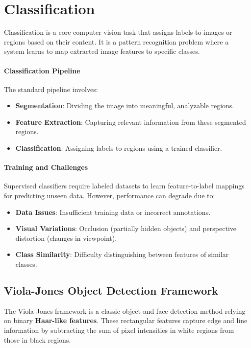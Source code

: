 \section{Classification}
Classification is a core computer vision task that assigns labels to images or regions based on their content. It is a pattern recognition problem where a system learns to map extracted image features to specific classes.

\paragraph{Classification Pipeline}
The standard pipeline involves:
\begin{itemize}
    \item \textbf{Segmentation}: Dividing the image into meaningful, analyzable regions.
    \item \textbf{Feature Extraction}: Capturing relevant information from these segmented regions.
    \item \textbf{Classification}: Assigning labels to regions using a trained classifier.
\end{itemize}

\paragraph{Training and Challenges}
Supervised classifiers require labeled datasets to learn feature-to-label mappings for predicting unseen data. However, performance can degrade due to:
\begin{itemize}
    \item \textbf{Data Issues}: Insufficient training data or incorrect annotations.
    \item \textbf{Visual Variations}: Occlusion (partially hidden objects) and perspective distortion (changes in viewpoint).
    \item \textbf{Class Similarity}: Difficulty distinguishing between features of similar classes.
\end{itemize}

\subsection{Viola-Jones Object Detection Framework}
The Viola-Jones framework is a classic object and face detection method relying on binary \textbf{Haar-like features}. These rectangular features capture edge and line information by subtracting the sum of pixel intensities in white regions from those in black regions. 

